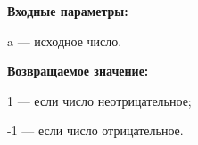 \textbf{Входные параметры:}

 a --- исходное число.

\textbf{Возвращаемое значение:}

 1 --- если число неотрицательное;
 
 -1 --- если число отрицательное.